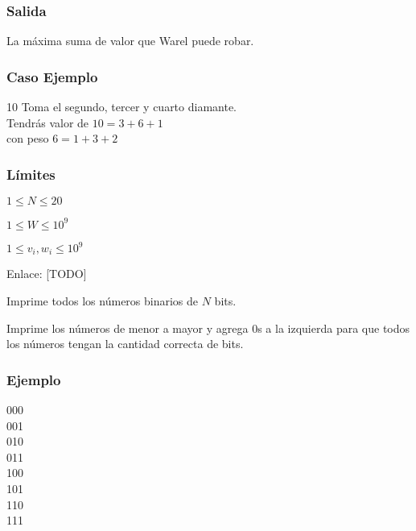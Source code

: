 \subsubsection*{Salida}
La máxima suma de valor que Warel puede robar.

\subsubsection*{Caso Ejemplo} 
\begin{casebox3}
	{10}
	{
		Toma el segundo, tercer y cuarto diamante. \\
		Tendrás valor de \(10=3+6+1\) \\
		con peso \(6=1+3+2\)
	}
\end{casebox3}

\subsubsection*{Límites}

\begin{plimits}
	\item \(1\leq N\leq 20 \)
	\item \(1\leq W\leq 10^9 \)
	\item \(1\leq v_i, w_i\leq 10^9 \)
\end{plimits}

Enlace: [TODO]

\problembreak

\problemtitle Imprime todos los números binarios de \(N\) bits. 

Imprime los números de menor a mayor y agrega 0s a la izquierda para que todos los números tengan la cantidad correcta de bits.

\subsubsection*{Ejemplo}
\begin{casebox2}
	{
		000 \\
	  	001 \\
	  	010 \\
	  	011 \\
	  	100 \\
	  	101 \\
	  	110 \\
	  	111 \\
	}
	\hline
\end{casebox2}

